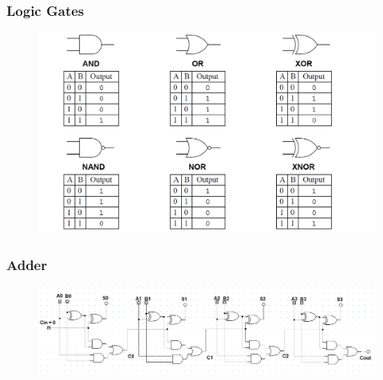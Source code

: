 \documentclass{beamer}
\begin{document}
\begin{frame}
\frametitle{Logic Gates}
\begin{figure}
\centering
\includegraphics[width=\textwidth]{logic_gates.png}
\label{Logic Gates}
\end{figure}
\end{frame}

\begin{frame}
\frametitle{Adder}
\begin{figure}
\centering
\includegraphics[width=\textwidth]{4bit_adder_3.png}
\label{Adder}
\end{figure}
\end{frame}
\end{document}
